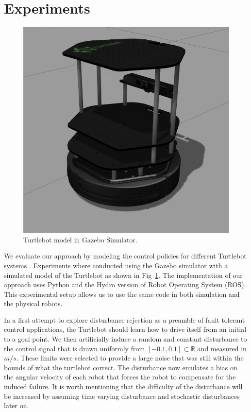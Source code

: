 \documentclass{aamas2016}
\renewcommand{\Re}{\mathbb{R}}
\begin{document}
\section{Experiments} \label{Experiments}

\begin{figure}[!htbp]
    \centering
        \includegraphics[width=.45\textwidth]{images/turtlebotsim_crop.png}
        \caption{Turtlebot model in Gazebo Simulator.}\label{fig:gazebo}
\end{figure}

We evaluate our approach by modeling the control policies for different Turtlebot systems \cite{Turtlebot-2016}. 
Experiments where conducted using the Gazebo simulator \cite{Gazebo-2016,ROS-2016} with a simulated model of the Turtlebot as shown in Fig~\ref{fig:gazebo}. 
The implementation of our approach uses Python and the Hydro version of Robot Operating System (ROS).
This experimental setup allows us to use the same code in both simulation and the physical robots.

In a first attempt to explore disturbance rejection as a preamble of
fault tolerant control applications, the Turtlebot should learn how to drive itself from an initial to a goal point.
We then artificially induce a random and constant disturbance to the control signal that is drawn uniformly from 
$[-0.1, 0.1] \subset \Re$ and measured in $m/s$. These limits were selected to provide a large noise that was still within the bounds of what the turtlebot correct.
The disturbance now emulates a bias on the angular velocity of each robot that forces the robot to
compensate for the induced failure. It is worth mentioning that the difficulty of the disturbance will be increased by assuming
time varying disturbance and stochastic disturbances later on.
\end{document}

